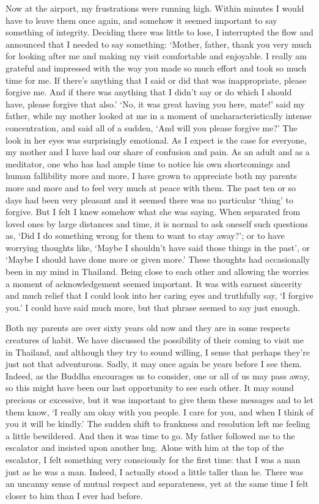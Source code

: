 Now at the airport, my frustrations were running high. Within minutes I
would have to leave them once again, and somehow it seemed important to
say something of integrity. Deciding there was little to lose, I
interrupted the flow and announced that I needed to say something:
`Mother, father, thank you very much for looking after me and making my
visit comfortable and enjoyable. I really am grateful and impressed with
the way you made so much effort and took so much time for me. If there's
anything that I said or did that was inappropriate, please forgive me.
And if there was anything that I didn't say or do which I should have,
please forgive that also.' `No, it was great having you here, mate!'
said my father, while my mother looked at me in a moment of
uncharacteristically intense concentration, and said all of a sudden,
`And will you please forgive me?' The look in her eyes was surprisingly
emotional. As I expect is the case for everyone, my mother and I have
had our share of confusion and pain. As an adult and as a meditator, one
who has had ample time to notice his own shortcomings and human
fallibility more and more, I have grown to appreciate both my parents
more and more and to feel very much at peace with them. The past ten or
so days had been very pleasant and it seemed there was no particular
`thing' to forgive. But I felt I knew somehow what she was saying. When
separated from loved ones by large distances and time, it is normal to
ask oneself such questions as, `Did I do something wrong for them to
want to stay away?'; or to have worrying thoughts like, `Maybe I
shouldn't have said those things in the past', or `Maybe I should have
done more or given more.' These thoughts had occasionally been in my
mind in Thailand. Being close to each other and allowing the worries a
moment of acknowledgement seemed important. It was with earnest
sincerity and much relief that I could look into her caring eyes and
truthfully say, `I forgive you.' I could have said much more, but that
phrase seemed to say just enough.

Both my parents are over sixty years old now and they are in some
respects creatures of habit. We have discussed the possibility of their
coming to visit me in Thailand, and although they try to sound willing,
I sense that perhaps they're just not that adventurous. Sadly, it may
once again be years before I see them. Indeed, as the Buddha encourages
us to consider, one or all of us may pass away, so this might have been
our last opportunity to see each other. It may sound precious or
excessive, but it was important to give them these messages and to let
them know, `I really am okay with you people. I care for you, and when I
think of you it will be kindly.' The sudden shift to frankness and
resolution left me feeling a little bewildered. And then it was time to
go. My father followed me to the escalator and insisted upon another
hug. Alone with him at the top of the escalator, I felt something very
consciously for the first time: that I was a man just as he was a man.
Indeed, I actually stood a little taller than he. There was an uncanny
sense of mutual respect and separateness, yet at the same time I felt
closer to him than I ever had before.

